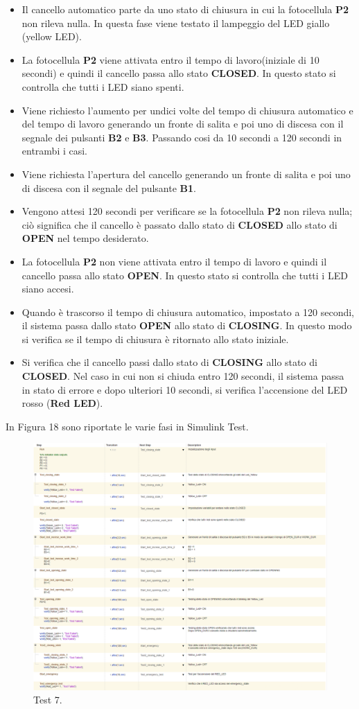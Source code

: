 \documentclass[12pt]{article}
\begin{document}
\begin{itemize}
    \item Il cancello automatico parte da uno stato di chiusura in cui la fotocellula \textbf{P2} non rileva nulla. In questa fase viene testato il lampeggio del LED giallo (yellow LED).
    \item La fotocellula \textbf{P2} viene attivata entro il tempo di lavoro(iniziale di 10 secondi) e quindi il cancello passa allo stato \textbf{CLOSED}. In questo stato si controlla che tutti i LED siano spenti.
    \item Viene richiesto l'aumento per undici volte del tempo di chiusura automatico e del tempo di lavoro generando un fronte di salita e poi uno di discesa con il segnale dei pulsanti \textbf{B2} e \textbf{B3}. Passando cosi da 10 secondi a 120 secondi in entrambi i casi.
    \item Viene richiesta l’apertura del cancello generando un fronte di salita e poi uno di discesa con il segnale del pulsante \textbf{B1}.
    \item Vengono attesi 120 secondi per verificare se la fotocellula \textbf{P2} non rileva nulla; ciò significa che il cancello è passato dallo stato di \textbf{CLOSED} allo stato di \textbf{OPEN} nel tempo desiderato.
    \item La fotocellula \textbf{P2} non viene attivata entro il tempo di lavoro e quindi il cancello passa allo stato \textbf{OPEN}. In questo stato si controlla che tutti i LED siano accesi.
    \item Quando è trascorso il tempo di chiusura automatico, impostato a 120 secondi, il sistema passa dallo stato \textbf{OPEN} allo stato di \textbf{CLOSING}. In questo modo si verifica se il tempo di chiusura è ritornato allo stato iniziale.
    \item Si verifica che il cancello passi dallo stato di \textbf{CLOSING} allo stato di \textbf{CLOSED}. Nel caso in cui non si chiuda entro 120 secondi, il sistema passa in stato di errore e dopo ulteriori 10 secondi, si verifica l'accensione del LED rosso (\textbf{Red LED}).
\end{itemize}

In Figura 18 sono riportate le varie fasi in Simulink Test.
\begin{figure}[H]
    
    \hspace{-2.3cm} %
    \includegraphics[width=1.3\textwidth]{Immagini_Test/Test_7_img.PNG}
    \caption{Test 7.}
    \label{fig:Test_7}
\end{figure}
\end{document}
